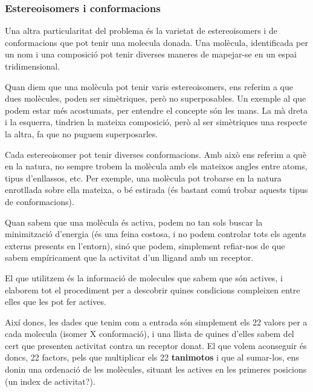 \documentclass[titlepage,a4paper,12pt]{book}
\begin{document}
\subsubsection{Estereoisomers i conformacions}
\label{ssub:estereoisomers i conformacions}

Una altra particularitat del problema és la varietat de estereoisomers i de
conformacions que pot tenir una molecula donada.  Una molècula, identificada per
un nom i una composició pot tenir diverses maneres de mapejar-se en un espai
tridimensional.

Quan diem que una molècula pot tenir varis estereoisomers, ens referim a que
dues molècules, poden ser simètriques, però no superposables.  Un exemple al que
podem estar més acostumats, per entendre el concepte són les mans.  La mà dreta
i la esquerra, tindrien la mateixa composició, però al ser simètriques una
respecte la altra, fa que no puguem superposarles.

Cada estereoisomer pot tenir diverses conformacions.  Amb això ens referim a què
en la natura, no sempre trobem la molècula amb els mateixos angles entre atoms,
tipus d'enllassos, etc. Per exemple, una molècula pot trobarse en la natura
enrotllada sobre ella mateixa, o bé estirada (és bastant comú trobar aquests
tipus de conformacions).


Quan sabem que una molècula és activa, podem no tan sols buscar la minimització
d'energia (és una feina costosa, i no podem controlar tots els agents externs
presents en l'entorn), sinó que podem, simplement refiar-nos de que sabem
empíricament que la activitat d'un lligand amb un receptor.



El que utilitzem és la informació de molecules que sabem que són actives,
i elaborem tot el procediment per a descobrir quines condicions compleixen entre
elles que les pot fer actives.

Així doncs, les dades que tenim com a entrada són simplement els 22 valors per a
cada molecula (isomer X conformació), i una llista de quines d'elles sabem del
cert que presenten activitat contra un receptor donat.  El que volem aconseguir
és doncs, 22 factors, pels que multiplicar els 22 \textbf{tanimotos} i que al
sumar-los, ens donin una ordenació de les molècules, situant les actives en
les primeres posicions (un index de activitat?).
\end{document}
